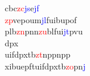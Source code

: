 \begin{frame}
{\begin{columns}[t]
\begin{column}{0.5\textwidth}
{\begin{minipage}{0.5\textwidth}
{cbc\textcolor{red}{zc}\textcolor{blue}{js}e\textcolor{blue}{jf}\\               %
\textcolor{red}{zp}vepoum\textcolor{blue}{jl}fuibupof\\       %
plb\textcolor{red}{zn}pnn\textcolor{red}{zu}blfui\textcolor{blue}{jt}pvu\\     %
dpx\\                      %
uifdpxtb\textcolor{red}{zt}nppnpp\\         %
xibuepftuifdpxtb\textcolor{red}{zo}pn\textcolor{blue}{j}\\    %
}
\end{minipage}
}
\end{column}
\end{columns}
}

\end{frame}
